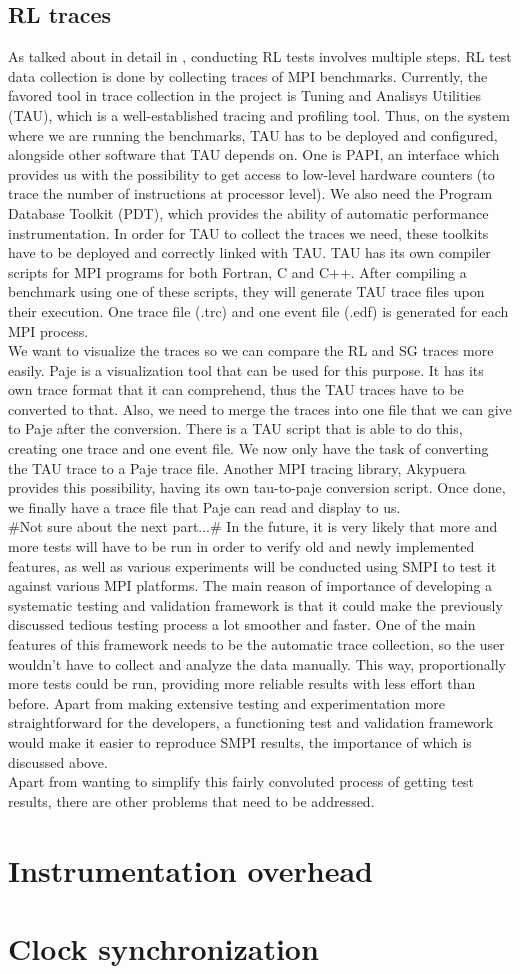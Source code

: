 \subsection{RL traces}
As talked about in detail in \cite{ms11}, conducting RL tests involves
multiple steps. RL test data collection is done by collecting traces
of MPI benchmarks. Currently, the favored tool in trace collection in
the project is Tuning and Analisys Utilities (TAU)\cite{sm06}, which
is a well-established tracing and profiling tool. Thus, on the system
where we are running the benchmarks, TAU has to be deployed and
configured, alongside other software that TAU depends on. One is PAPI,
an interface which provides us with the possibility to
get access to low-level hardware counters (to trace the number of
instructions at processor level). We also need the Program Database
Toolkit (PDT), which provides the ability of automatic performance
instrumentation. In order for TAU to collect the traces we need, these
toolkits have to be deployed and correctly linked with TAU. TAU has
its own compiler scripts for MPI programs for both Fortran, C and
C++. After compiling a benchmark using one of these scripts, they will
generate TAU trace files upon their execution. One trace file (.trc)
and one event file (.edf) is generated for each MPI process.\\
We want to visualize the traces so we can compare the RL and SG
traces more easily. Paje is a visualization tool that can be used for
this purpose. It has its own trace format that it can comprehend, thus
the TAU traces have to be converted to that. Also, we need to merge
the traces into one file that we can give to Paje after the
conversion. There is a
TAU script that is able to do this, creating one trace and one event
file. We now only have the task of converting the TAU trace to a Paje
trace file. Another MPI tracing library, Akypuera provides this
possibility, having its own tau-to-paje conversion script. Once done,
we finally have a trace file that Paje can read and display to us.\\
\#Not sure about the next part...\#
In the future, it is very likely that more and more tests will have to
be run in order to verify old and newly implemented features, as well
as various experiments will be conducted using SMPI to test it against
various MPI platforms. The main reason of importance of developing a
systematic testing and validation framework is that it could make the
previously discussed tedious testing process a lot smoother and
faster. One of the main features of this framework needs to be the
automatic trace collection, so the user wouldn't have to collect and
analyze the data manually. This way, proportionally more tests
could be run, providing more reliable results with less effort than
before. Apart from making extensive testing and experimentation more
straightforward for the developers, a functioning test and validation
framework would make it easier to reproduce SMPI results, the
importance of which is discussed above.\\
Apart from wanting to simplify this fairly convoluted process of
getting test results, there are other problems that need to be
addressed.
\section{Instrumentation overhead}
\section{Clock synchronization}
